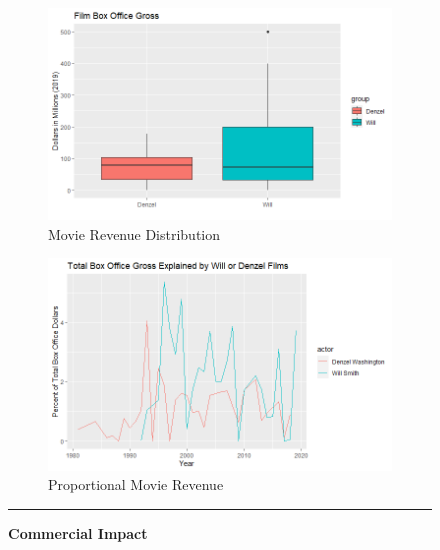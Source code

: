 \documentclass[]{article}
\begin{document}
\begin{figure}[!ht]
    \begin{subfigure}[h]{0.5\textwidth}
    \centering
            \includegraphics[clip,scale=0.4]{plots/gross_dist.png}
        \caption{ Movie Revenue Distribution}
        \label{fig:rev-dist-plot}
    \end{subfigure}
    \begin{subfigure}[h]{0.5\textwidth}
    \centering
        \includegraphics[clip,scale=0.4]{plots/total_gross.png}
            \caption{Proportional Movie Revenue}
        \label{fig:prop-gross-plot}
    \end{subfigure}
    \vspace{2.5mm}
    \hrule
    \vspace{2.5mm}
        \caption{\textbf{ Commercial Impact } }
        \label{fig:ce-plot}
\end{figure}
\end{document}
